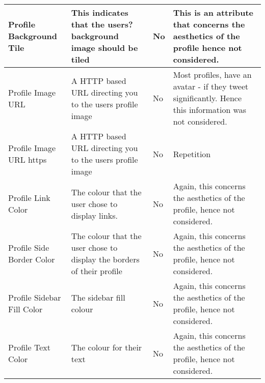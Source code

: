 \begin{landscape}
\begin{longtable}{|C{1.00in}|C{2.50in}|C{.60in}|C{5.00in}|}
\hline    
Profile Background Tile            & This indicates that the users? background image should be tiled                                                                & No          & This is an attribute that concerns the aesthetics of the profile hence not considered.                                                                                                           \\
\hline    
Profile Image URL                  & A HTTP based URL directing you to the users profile image                                                                      & No          & Most profiles, have an avatar - if they tweet significantly. Hence this information was not considered.                                                                                          \\
\hline    
Profile Image URL https            & A HTTP based URL directing you to the users profile image                                                                      & No          & Repetition                                                                                                                                                                                       \\
\hline    
Profile Link Color                 & The colour that the user chose to display links.                                                                               & No          & Again, this concerns the aesthetics of the profile, hence not considered.                                                                                                                        \\
\hline    
Profile Side Border Color          & The colour that the user chose to display the borders of their profile                                                         & No          & Again, this concerns the aesthetics of the profile, hence not considered.                                                                                                                        \\
\hline    
Profile Sidebar Fill Color         & The sidebar fill colour                                                                                                        & No          & Again, this concerns the aesthetics of the profile, hence not considered.                                                                                                                        \\
\hline    
Profile Text Color                 & The colour for their text                                                                                                      & No          & Again, this concerns the aesthetics of the profile, hence not considered.                                                                                                                        \\

\end{longtable}
\end{landscape}
